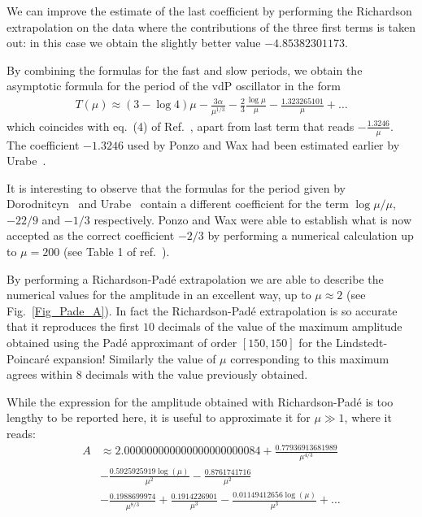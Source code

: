 \documentclass[final]{article}
\begin{document}
We can improve the estimate of the last coefficient by performing the Richardson extrapolation on the data where the contributions of the three
first terms is taken out: in this case we obtain the slightly better value $-4.85382301173$.

By combining the formulas for the fast and slow periods, we obtain the asymptotic formula for the period of the vdP oscillator in the form
\begin{equation}
	\begin{split}
		T(\mu) \approx (3-\log 4)  \mu - \frac{3 \alpha}{\mu^{1/3}}  - \frac{2}{3} \frac{\log \mu}{\mu}-\frac{1.323265101}{\mu}  + \dots
	\end{split}
\end{equation}
which coincides with eq.~(4) of Ref.~\cite{Ponzo65b}, apart from last term that reads $-\frac{1.3246}{\mu}$. The coefficient $-1.3246$ used by Ponzo and Wax had been estimated earlier by Urabe~\cite{Urabe60}. 

It is interesting to observe that the formulas for the period given by Dorodnitcyn~\cite{Dor47,Dor52} and Urabe~\cite{Urabe60} contain a different
coefficient for the term $\log \mu/\mu$, $-22/9$ and $-1/3$ respectively. Ponzo and Wax were able to establish what is now accepted as the correct coefficient $-2/3$ by performing a numerical calculation up to $\mu = 200$ (see Table 1 of ref.~\cite{Ponzo65b}).



By performing a Richardson-Pad\'e extrapolation we are able to describe the numerical values for the amplitude in an excellent way, up to $\mu \approx 2$ (see Fig.~\ref{Fig_Pade_A}). In fact the Richardson-Pad\'e extrapolation is so accurate that it reproduces the first $10$ decimals of the value of the maximum amplitude obtained using the Pad\'e approximant of order $[150,150]$ for the Lindstedt-Poincar\'e expansion! Similarly the value of $\mu$ corresponding to this maximum agrees within $8$ decimals with the value previously obtained. 

While the expression for the amplitude obtained with Richardson-Pad\'e is too lengthy to be reported here, it is useful to 
approximate it for $\mu \gg 1$, where it reads:
\begin{equation}
\begin{split}
A &\approx 2.000000000000000000000084 + \frac{0.77936913681989}{\mu^{4/3}} \\
&-\frac{0.5925925919 \log (\mu)}{\mu^2} -\frac{0.8761741716}{\mu^2} \\
&- \frac{0.1988699974}{\mu^{8/3}} +\frac{0.1914226901}{\mu^3}-\frac{0.01149412656 \log (\mu )}{\mu^3} +\dots
\end{split}
\end{equation}
\end{document}
